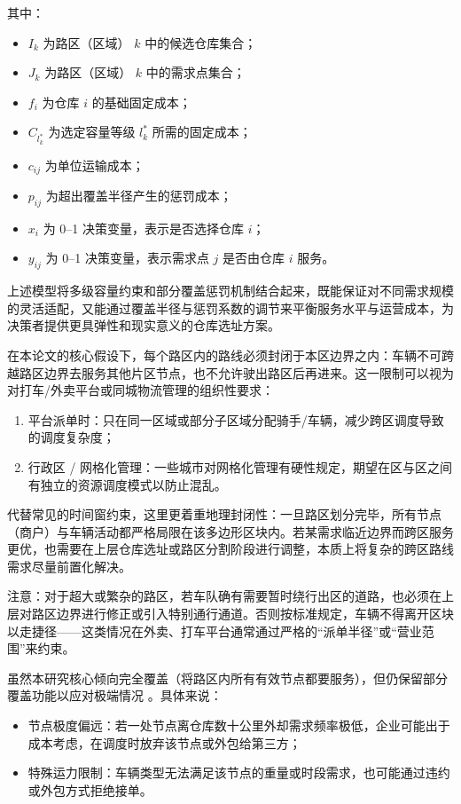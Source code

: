\documentclass[12pt,a4paper,twoside]{ctexbook}
\begin{document}
\noindent 其中：
\begin{itemize}
  \item $I_k$ 为路区（区域） $k$ 中的候选仓库集合；
  \item $J_k$ 为路区（区域） $k$ 中的需求点集合；
  \item $f_i$ 为仓库 $i$ 的基础固定成本；
  \item $C_{l_k^*}$ 为选定容量等级 $l_k^*$ 所需的固定成本；
  \item $c_{ij}$ 为单位运输成本；
  \item $p_{ij}$ 为超出覆盖半径产生的惩罚成本；
  \item $x_i$ 为 0–1 决策变量，表示是否选择仓库 $i$；
  \item $y_{ij}$ 为 0–1 决策变量，表示需求点 $j$ 是否由仓库 $i$ 服务。
\end{itemize}

上述模型将多级容量约束和部分覆盖惩罚机制结合起来，既能保证对不同需求规模的灵活适配，又能通过覆盖半径与惩罚系数的调节来平衡服务水平与运营成本，为决策者提供更具弹性和现实意义的仓库选址方案。

在本论文的核心假设下，每个路区内的路线必须封闭于本区边界之内：车辆不可跨越路区边界去服务其他片区节点，也不允许驶出路区后再进来。这一限制可以视为对打车/外卖平台或同城物流管理的组织性要求：
\begin{enumerate}
    \item 平台派单时：只在同一区域或部分子区域分配骑手/车辆，减少跨区调度导致的调度复杂度；
    \item 行政区 / 网格化管理：一些城市对网格化管理有硬性规定，期望在区与区之间有独立的资源调度模式以防止混乱。
\end{enumerate}

代替常见的时间窗约束，这里更着重地理封闭性：一旦路区划分完毕，所有节点（商户）与车辆活动都严格局限在该多边形区块内。若某需求临近边界而跨区服务更优，也需要在上层仓库选址或路区分割阶段进行调整，本质上将复杂的跨区路线需求尽量前置化解决。

注意：对于超大或繁杂的路区，若车队确有需要暂时绕行出区的道路，也必须在上层对路区边界进行修正或引入特别通行通道。否则按标准规定，车辆不得离开区块以走捷径——这类情况在外卖、打车平台通常通过严格的“派单半径”或“营业范围”来约束。

虽然本研究核心倾向完全覆盖（将路区内所有有效节点都要服务），但仍保留部分覆盖功能以应对极端情况 \cite{salazar2013multi}。具体来说：
\begin{itemize}
    \item 节点极度偏远：若一处节点离仓库数十公里外却需求频率极低，企业可能出于成本考虑，在调度时放弃该节点或外包给第三方；
    \item 特殊运力限制：车辆类型无法满足该节点的重量或时段需求，也可能通过违约或外包方式拒绝接单。
\end{itemize}
\end{document}
